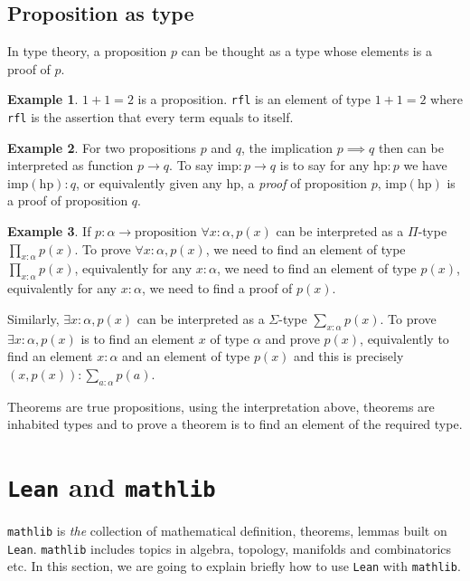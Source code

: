 \documentclass{report}
\theoremstyle{definition}
\newtheorem{example}{Example}
\begin{document}
\subsection{Proposition as type}
In type theory, a proposition $p$ can be thought as a type whose elements is a proof of $p$.

\begin{example}
$1+1=2$ is a proposition. {\tt \small rfl} is an element of type $1+1=2$ where {\tt \small rfl} is the assertion that every term equals to itself.
\end{example}

\begin{example}
For two propositions $p$ and $q$, the implication $p\implies q$ then can be interpreted as function $p\to q$. To say $\mathrm{imp}: p\to q$ is to say for any $\mathrm{hp}:p$ we have $\mathrm{imp}( \mathrm{hp}): q$, or equivalently given any $\mathrm{hp}$, a {\it proof} of proposition $p$, $\mathrm{imp}(\mathrm{hp})$ is a proof of proposition $q$. 
\end{example}

\begin{example}
If $p:\alpha\to\mathrm{proposition}$
$\forall x : \alpha, p(x)$ can be interpreted as a $\Pi$-type $\prod_{x:\alpha} p(x)$. To prove $\forall x: \alpha, p(x)$, we need to find an element of type $\prod_{x:\alpha} p(x)$, equivalently for any $x:\alpha$, we need to find an element of type $p(x)$, equivalently for any $x:\alpha$, we need to find a proof of $p (x)$.

Similarly, $\exists x:\alpha, p(x)$ can be interpreted as a $\Sigma$-type $\sum_{x:\alpha} p(x)$. To prove $\exists x:\alpha, p(x)$ is to find an element $x$ of type $\alpha$ and prove $p(x)$, equivalently to find an element $x:\alpha$ and an element of type $p(x)$ and this is precisely $(x, p(x)):\sum_{a:\alpha} p(a)$.
\end{example}

Theorems are true propositions, using the interpretation above, theorems are inhabited types and to prove a theorem is to find an element of the required type.

\section{{\tt Lean} and {\tt mathlib}}
{\tt \small mathlib} is {\it the} collection of mathematical definition, theorems, lemmas built on {\tt \small Lean}. {\tt \small mathlib} includes topics in algebra, topology, manifolds and combinatorics etc. In this section, we are going to explain briefly how to use {\tt \small Lean} with {\tt \small mathlib}.
\end{document}
